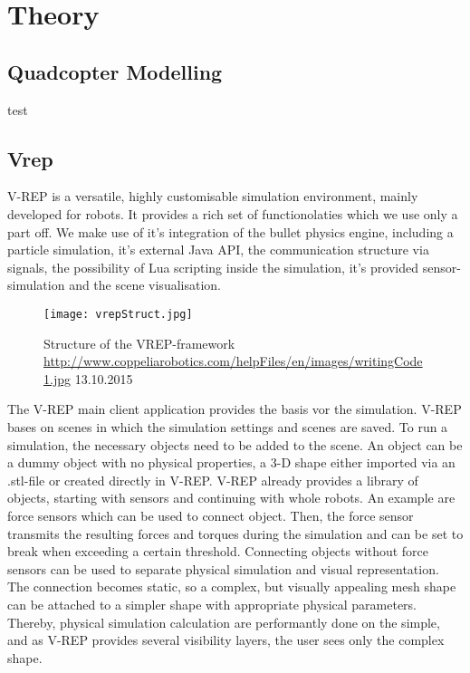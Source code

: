 \chapter{Theory}
\label{chap:theo}




\section{Quadcopter Modelling}

\par{test}







\section{Vrep}
\label{sec:theoryVrep}
V-REP is a versatile, highly customisable simulation environment, mainly developed for robots. It provides a rich set of functionolaties which we use only a part off.  We make use of it's integration of the bullet physics engine, including a particle simulation, it's external Java API, the communication structure via signals, the possibility of Lua scripting inside the simulation, it's provided sensor-simulation and the scene visualisation.
\begin{figure}[h!]
 \begin{center}
  \texttt{[image: vrepStruct.jpg]}
 \end{center}
  \caption{Structure of the VREP-framework \url{http://www.coppeliarobotics.com/helpFiles/en/images/writingCode1.jpg} 13.10.2015 \label{fig:vrepStruct}}
\end{figure}

The V-REP main client application provides the basis vor the simulation. V-REP bases on scenes in which the simulation settings and scenes are saved. To run a simulation, the necessary objects need to be added to the scene. An object can be a dummy object with no physical properties, a 3-D shape either imported via an .stl-file or created directly in V-REP. V-REP already provides a library of objects, starting with sensors and continuing with whole robots. An example are force sensors which can be used to connect object. Then, the force sensor transmits the resulting forces and torques during the simulation and can be set to break when exceeding a certain threshold. Connecting objects without force sensors can be used to separate physical simulation and visual representation. The connection becomes static, so a complex, but visually appealing mesh shape can be attached to a simpler shape with appropriate physical parameters. Thereby, physical simulation calculation are performantly done on the simple, and as V-REP provides several visibility layers, the user sees only the complex shape.


